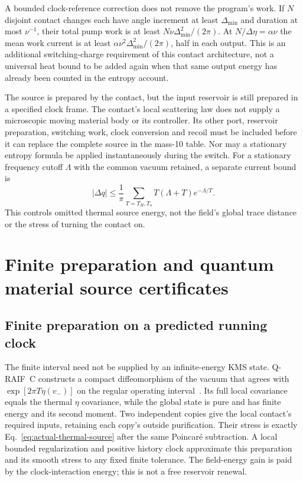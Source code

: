 \documentclass[12pt,a4paper]{article}
\begin{document}
A bounded clock-reference correction does not remove the program's
work. If $N$ disjoint contact changes each have angle increment at least
$\Delta_{\min}$ and duration at most $\nu^{-1}$, their total pump
work is at least $N\nu\Delta_{\min}^2/(2\pi)$.
At $N/\Delta\eta=\alpha\nu$ the mean work current is at least
$\alpha\nu^2\Delta_{\min}^2/(2\pi)$, half in each output.
This is an additional switching-charge requirement of this contact
architecture, not a universal heat bound to be added again when that
same output energy has already been counted in the entropy account.

The source is prepared by the contact, but the input reservoir is still
prepared in a specified clock frame. The contact's local scattering law
does not supply a microscopic moving material body or its controller.
Its other port, reservoir preparation, switching work, clock conversion
and recoil must be included before it can replace the complete source
in the mass-10 table. Nor may a stationary entropy formula be applied
instantaneously during the switch. For a stationary frequency cutoff
$\Lambda$ with the common vacuum retained, a separate current bound is
\[
 |\Delta q|\le\frac1\pi\sum_{T=T_H,T_o}
                  T(\Lambda+T)e^{-\Lambda/T}.
\]
This controls omitted thermal source energy, not the field's global
trace distance or the stress of turning the contact on.


\section{Finite preparation and quantum material source certificates}
\label{app:material-certificates}

\subsection{Finite preparation on a predicted running clock}
\label{sec:finite-thermal-preparation}

The finite interval need not be supplied by an infinite-energy KMS
state. Q-RAIF~C constructs a compact diffeomorphism of the vacuum
that agrees with $\exp[2\pi T\eta(v_-)]$ on the regular operating
interval~\cite[Section on thermal correlations from a finite-energy
preparation]{QRC}. Its full local covariance equals the thermal
$\eta$ covariance, while the global state is pure and has finite
energy and its second moment. Two independent copies give the local
contact's required inputs, retaining each copy's outside purification.
Their stress is exactly Eq.~\eqref{eq:actual-thermal-source} after
the same Poincar\'e subtraction. A local bounded regularization and
positive history clock approximate this preparation and its smooth
stress to any fixed finite tolerance. The field-energy gain is paid
by the clock-interaction energy; this is not a free reservoir renewal.
\end{document}
